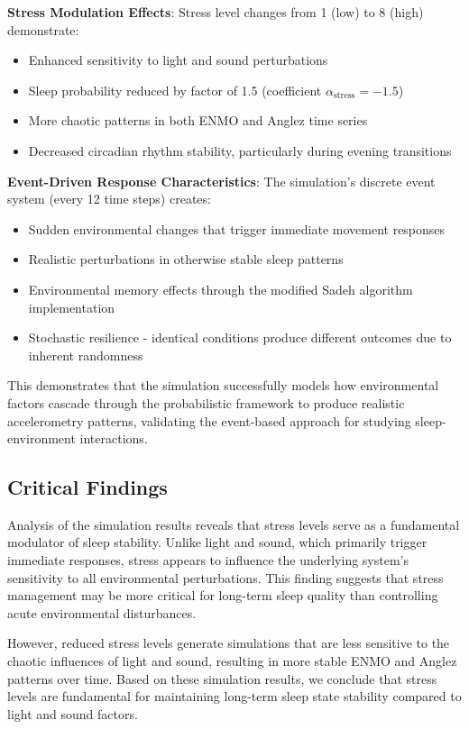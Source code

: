 \documentclass[conference]{IEEEtran}
\begin{document}
\textbf{Stress Modulation Effects}: Stress level changes from 1 (low) to 8 (high) demonstrate:
\begin{itemize}
	\item Enhanced sensitivity to light and sound perturbations
	\item Sleep probability reduced by factor of 1.5 (coefficient $\alpha_{\text{stress}} = -1.5$)
	\item More chaotic patterns in both ENMO and Anglez time series
	\item Decreased circadian rhythm stability, particularly during evening transitions
\end{itemize}

\textbf{Event-Driven Response Characteristics}: The simulation's discrete event system (every 12 time steps) creates:
\begin{itemize}
	\item Sudden environmental changes that trigger immediate movement responses
	\item Realistic perturbations in otherwise stable sleep patterns
	\item Environmental memory effects through the modified Sadeh algorithm implementation
	\item Stochastic resilience - identical conditions produce different outcomes due to inherent randomness
\end{itemize}

This demonstrates that the simulation successfully models how environmental factors cascade through the probabilistic framework to produce realistic accelerometry patterns, validating the event-based approach for studying sleep-environment interactions.

\subsection{Critical Findings}

Analysis of the simulation results reveals that stress levels serve as a fundamental modulator of sleep stability. Unlike light and sound, which primarily trigger immediate responses, stress appears to influence the underlying system's sensitivity to all environmental perturbations. This finding suggests that stress management may be more critical for long-term sleep quality than controlling acute environmental disturbances.

However, reduced stress levels generate simulations that are less sensitive to the chaotic influences of light and sound, resulting in more stable ENMO and Anglez patterns over time. Based on these simulation results, we conclude that stress levels are fundamental for maintaining long-term sleep state stability compared to light and sound factors.
\end{document}
